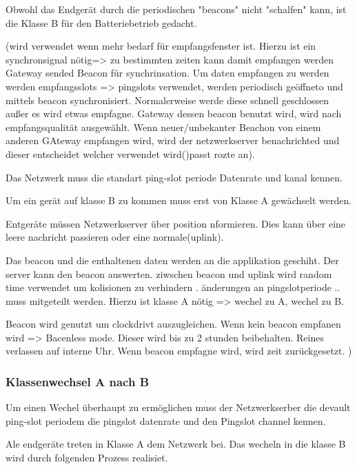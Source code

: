 \documentclass[a4paper,12pt]{article}
\begin{document}
            

            Obwohl das Endgerät durch die periodischen "beacons" nicht "schalfen" kann, ist die Klasse B für den Batteriebetrieb gedacht.
            
            \cite{LoRaSpec}(wird verwendet wenn mehr bedarf für empfangsfenster ist. Hierzu ist ein synchronsignal nötig=> zu bestimmten zeiten kann damit empfangen werden
                Gateway sended Beacon für synchrinsation. Um daten empfangen zu werden werden empfangsslots => pingslots verwendet, werden periodisch geöffneto und mittels beacon synchronisiert. Normalerweise werde diese schnell geschlossen außer es wird etwas empfagne.
                Gateway dessen beacon benutzt wird, wird nach empfangsqualität ausgewählt. Wenn neuer/unbekanter Beachon von einem anderen GAteway empfangen wird, wird der netzwerkserver benachrichted und dieser entscheidet welcher verwendet wird()passt rozte an).

                Das Netzwerk muss die standart ping-slot periode Datenrate und kanal kennen.

                Um ein gerät auf klasse B zu kommen muss erst von Klasse A gewächselt werden.

                Entgeräte müssen Netzwerkserver über position nformieren. Dies kann über eine leere nachricht passieren oder eine normale(uplink).
                
                Das beacon und die enthaltenen daten werden an die applikation geschiht. Der server kann den beacon auswerten. ziwschen beacon und uplink wird random time verwendet um kolisionen zu verhindern .
                änderungen an pingslotperiode .. muss mitgeteilt werden. Hierzu ist klasse A nötig => wechel zu A, wechel zu B.
            
                Beacon wird genutzt um clockdrivt auszugleichen. Wenn kein beacon empfanen wird  => Bacenless mode. Dieser wird bis zu 2 stunden beibehalten. Reines verlassen auf interne Uhr. Wenn beacon empfagne wird, wird zeit zurückgesetzt.
            )
            \subsubsection{Klassenwechsel A nach B}
                Um einen Wechel überhaupt zu ermöglichen muss der Netzwerkserber die devault ping-slot periodem die pingslot datenrate und den Pingslot channel kennen.

                Ale endgeräte treten in Klasse A dem Netzwerk bei. Das wecheln in die klasse B wird durch folgenden Prozess realisiet.
\end{document}
